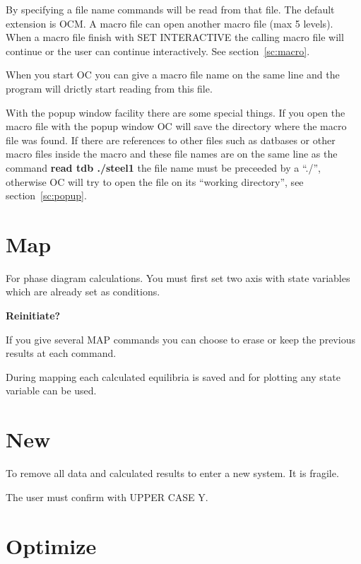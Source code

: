 \documentclass[11pt]{article}
\begin{document}
By specifying a file name commands will be read from that file.  The
default extension is OCM.  A macro file can open another macro file
(max 5 levels).  When a macro file finish with SET INTERACTIVE the
calling macro file will continue or the user can continue
interactively.  See section~\ref{sc:macro}.

When you start OC you can give a macro file name on the same line and
the program will drictly start reading from this file.

With the popup window facility there are some special things.  If you
open the macro file with the popup window OC will save the directory
where the macro file was found.  If there are references to other
files such as datbases or other macro files inside the macro and these
file names are on the same line as the command {\bf read tdb ./steel1}
the file name must be preceeded by a ``./'', otherwise OC will try to
open the file on its ``working directory'', see
section~\ref{sc:popup}.

\hypertarget{Map}{}
\hypertarget{Map old data}{}
\section{Map }\label{sc:map}

For phase diagram calculations.  You must first set two axis with
state variables which are already set as conditions.

{\bf Reinitiate?}

If you give several MAP commands you can choose to erase or keep the
previous results at each command.

During mapping each calculated equilibria is saved and for plotting
any state variable can be used.

\section{New }
\hypertarget{New}{}

To remove all data and calculated results to enter a new system.  It
is fragile.

The user must confirm with UPPER CASE Y.

\hypertarget{Optimize}{}
\section{Optimize}\label{sc:optim}
\end{document}
